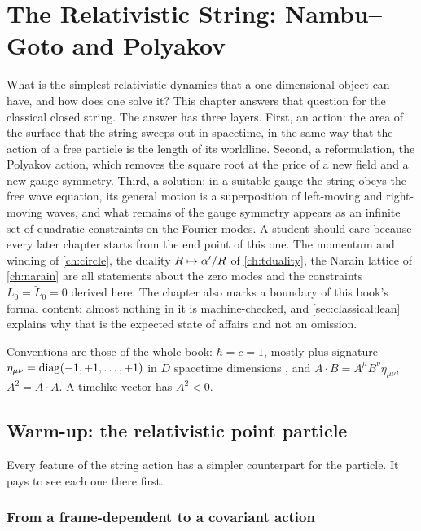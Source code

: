 \chapter{The Relativistic String: Nambu--Goto and Polyakov}\label{ch:classical}

What is the simplest relativistic dynamics that a one-dimensional object can have, and how
does one solve it? This chapter answers that question for the classical closed string. The
answer has three layers. First, an action: the area of the surface that the string sweeps
out in spacetime, in the same way that the action of a free particle is the length of its
worldline. Second, a reformulation, the Polyakov action, which removes the square root at the
price of a new field and a new gauge symmetry. Third, a solution: in a suitable gauge the
string obeys the free wave equation, its general motion is a superposition of left-moving and
right-moving waves, and what remains of the gauge symmetry appears as an infinite set of
quadratic constraints on the Fourier modes. A student should care because every later
chapter starts from the end point of this one. The momentum and winding of
\cref{ch:circle}, the duality $R\mapsto\alpha'/R$ of \cref{ch:tduality}, the Narain lattice of
\cref{ch:narain} are all statements about the zero modes and the constraints $L_0=\tilde
L_0=0$ derived here. The chapter also marks a boundary of this book's formal content: almost
nothing in it is machine-checked, and \cref{sec:classical:lean} explains why that is the
expected state of affairs and not an omission.

Conventions are those of the whole book: $\hbar=c=1$, mostly-plus signature
$\eta_{\mu\nu}=\operatorname{diag}(-1,+1,\dots,+1)$ in $D$ spacetime dimensions
, and $A\cdot B=A^\mu B^\nu\eta_{\mu\nu}$, $A^2=A\cdot A$. A
timelike vector has $A^2<0$.

\section{Warm-up: the relativistic point particle}\label{sec:classical:particle}

Every feature of the string action has a simpler counterpart for the particle. It pays to
see each one there first.

\subsection{From a frame-dependent to a covariant action}

